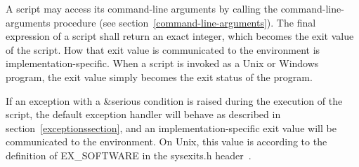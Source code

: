 A script may access its command-line arguments by calling the {\cf
  command-line-arguments} procedure (see
section~\ref{command-line-arguments}).  The final expression of a
script shall return an exact integer, which becomes the exit value of
the script.  How that exit value is communicated to the environment is
implementation-specific.  When a script is invoked as a Unix or
Windows program, the exit value simply becomes the exit status of the
program.

If an exception with a {\cf\&serious} condition is raised during the
execution of the script, the default exception handler will behave as
described in section~\ref{exceptionssection}, and an
implementation-specific exit value will be communicated to the
environment.  On Unix, this value is according to the definition of
{\cf EX\_SOFTWARE} in the {\cf sysexits.h} header~\cite{srfi22}.

